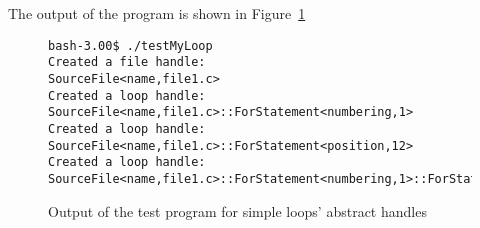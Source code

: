 The output of the program is shown in Figure~\ref{Tutorial:testMyLoopOutput}
\begin{figure}[!h]
{\indent
{\mySmallestFontSize
\begin{latexonly}
\begin{lstlisting} 
bash-3.00$ ./testMyLoop
Created a file handle:
SourceFile<name,file1.c>
Created a loop handle:
SourceFile<name,file1.c>::ForStatement<numbering,1>
Created a loop handle:
SourceFile<name,file1.c>::ForStatement<position,12>
Created a loop handle:
SourceFile<name,file1.c>::ForStatement<numbering,1>::ForStatement<numbering,1>
\end{lstlisting}
\end{latexonly}
}
}
\caption{Output of the test program for simple loops' abstract handles}
\label{Tutorial:testMyLoopOutput}
\end{figure}



